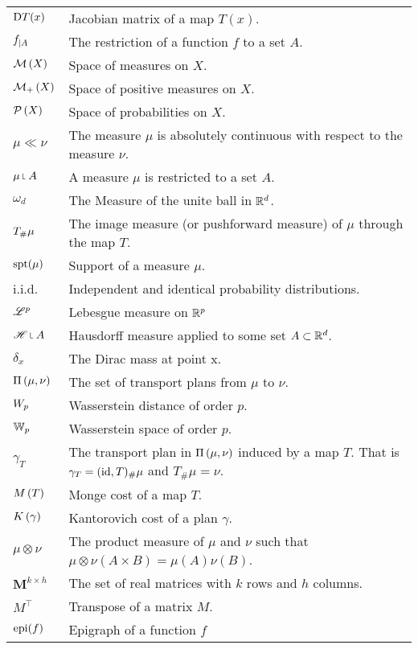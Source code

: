 \begin{tabular}{ l l }
	$\D T(x)$ & Jacobian matrix of a map $T(x)$. \\
	$\domainrestr{A}{f}$ & The restriction of a function $f$ to a set $A$. \\
	$\MeasureSp\parentheses{X}$ & Space of measures on $X$. \\
	$\PMeasureSp\parentheses{X}$ & Space of positive measures on $X$. \\
	$\PlanSp\parentheses{X}$ & Space of probabilities on $X$. \\	
	$\mu \ll\nu$ & The measure $\mu$ is absolutely continuous with respect to the measure $\nu$. \\
	$\mu \measurerestr A$ & A measure $\mu$ is restricted to a set $A$.\\
	$\omega_d$ & The Measure of the unite ball in $\Real^d$. \\
	$\Tmeasure{\mu}{T}$ &  The image measure (or pushforward measure) of $\mu$ through the map $T$.\\
	$\spt(\mu)$& Support of a measure $\mu$.\\
	i.i.d. & Independent and identical probability distributions.\\
	$\Lebesgue^p$ & Lebesgue measure on $\Real^p$\\
	$\Hausdorff\measurerestr A$ & Hausdorff measure applied to some set $A \subset \Real^d$. \\
	$\delta_x$ & The Dirac mass at point x. \\
	$\TransPlansSet{\mu}{\nu}$ & The set of transport plans from $\mu$ to $\nu$.\\
	$\WassersteinDist{p}$ & Wasserstein distance of order $p$. \\	
	$\WassersteinSp{p}$ & Wasserstein space of order $p$.\\
 	$\gamma_T$ & The transport plan in $\TransPlansSet{\mu}{\nu}$ induced by a map $T$. That is $\gamma_T = (\id, T)_\#\mu$ and $T_\#\mu=\nu$. \\
	$\Monge$ & Monge cost of a map $T$. \\
	$\Kantorovich$ & Kantorovich cost of a plan $\gamma$. \\	
	$\mu \otimes \nu$ & The product measure of $\mu$ and $\nu$ such that $\mu \otimes \nu (A\times B)= \mu(A)\nu(B)$.\\
	$\mathbf{M}^{k\times h}$ & The set of real matrices with $k$ rows and $h$ columns. \\
	$M^\top$ & Transpose of a matrix $M$. \\
	$\epi(f)$ & Epigraph of a function $f$
\end{tabular}
